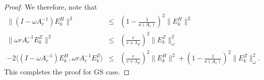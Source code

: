 \begin{itemize}
\begin{proof}
We therefore, note that 
\begin{eqnarray*}
\|(I - \omega A_r^{-1}) E_k^H \|^2 &\leq& \left (1 - \frac{1}{\kappa(A_r)} \right )^2 \|E_k^H\|^2 \\ 
\|\omega r A_r^{-1} E_k^Z\|^2 &\leq& \left ( \frac{r}{r+\lambda_F} \right )^2 
\|E_k^Z\|_\omega^2 \\ 
- 2 \langle(I - \omega A_r^{-1}) E_k^H, \omega r A_r^{-1} E_k^Z \rangle &\leq& \left ( \frac{r}{r+\lambda_F} \right )^2 \|E_k^H\|^2 + \left (1 - \frac{1}{\kappa(A_r)} \right )^2 \|E_k^Z\|_\omega^2.  
\end{eqnarray*}
This completes the proof for GS case. 
\end{proof} 



\end{itemize}

